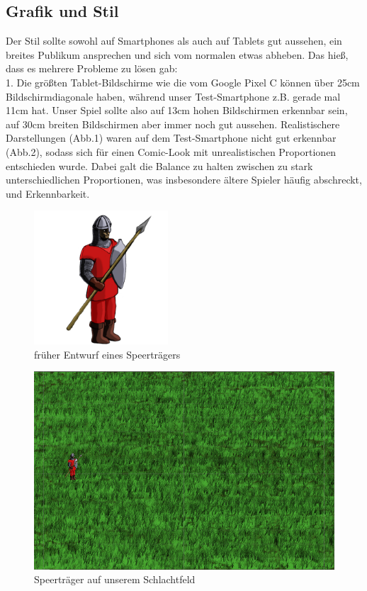 \documentclass[extern,palatino]{cgBA}
\begin{document}
\subsection{Grafik und Stil}
Der Stil sollte sowohl auf Smartphones als auch auf Tablets gut aussehen, ein breites Publikum ansprechen und sich vom normalen etwas abheben. Das hieß, dass es mehrere Probleme zu lösen gab:
\\1. Die größten Tablet-Bildschirme wie die vom Google Pixel C können über 25cm Bildschirmdiagonale haben, während unser Test-Smartphone z.B. gerade mal 11cm hat. Unser Spiel sollte also auf 13cm hohen Bildschirmen erkennbar sein, auf 30cm breiten Bildschirmen aber immer noch gut aussehen. Realistischere Darstellungen (Abb.1) waren auf dem Test-Smartphone  nicht gut erkennbar (Abb.2), sodass sich für einen Comic-Look mit unrealistischen Proportionen entschieden wurde. Dabei galt die Balance zu halten zwischen zu stark unterschiedlichen Proportionen, was insbesondere ältere Spieler häufig abschreckt, und Erkennbarkeit.
\begin{figure}
	\centering
	\includegraphics[height=5cm]{soldier.png}
	\caption{früher Entwurf eines Speerträgers}
\end{figure}
\begin{figure}
	\centering
	\includegraphics[width=13cm]{soldierbackground.png}
	\caption{Speerträger auf unserem Schlachtfeld}
\end{figure}
\end{document}
